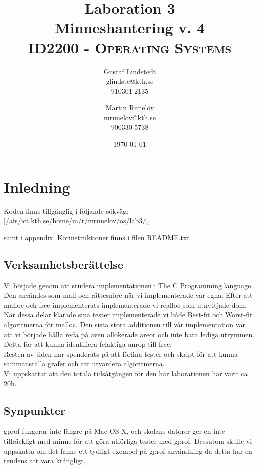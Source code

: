 \documentclass[paper=a4, fontsize=11pt]{scrartcl} %
\title{ 
\huge Laboration 3 \\ Minneshantering v. 4 \\ %
\vspace{10pt}
\normalfont \normalsize 
\textsc{ID2200 - Operating Systems } \\ [25pt] %
}
\author{Gustaf Lindstedt \\ glindste@kth.se \\ 910301-2135 \and Martin Runelöv \\ mrunelov@kth.se \\ 900330-5738}
\date{\vspace{8pt}\normalsize\today} %
\numberwithin{equation}{section} %
\numberwithin{figure}{section} %
\numberwithin{table}{section} %
\begin{document}
\maketitle

\section{Inledning}

Koden finns tillgänglig i följande sökväg: |/afs/ict.kth.se/home/m/r/mrunelov/os/lab3/|,

samt i appendix. Körinstruktioner finns i filen README.txt



\subsection{Verksamhetsberättelse}

Vi började genom att studera implementationen i The C Programming language.
Den användes som mall och rättesnöre när vi implementerade vår egna.
Efter att malloc och free implementerats implementerade vi realloc som
utnyttjade dom.
När dessa delar klarade sina tester implementerade vi både Best-fit och
Worst-fit algoritmerna för malloc.
Den sista stora additionen till vår implementation var att vi började hålla
reda på även allokerade areor och inte bara lediga utrymmen.
Detta för att kunna identifiera felaktiga anrop till free. \\

Resten av tiden har spenderats på att förfina tester och skript för att kunna
sammanställa grafer och att utvärdera algoritmerna.\\

Vi uppskattar att den totala tidsåtgången för den här laborationen har varit
ca 20h.\\


\subsection{Synpunkter}
gprof fungerar inte längre på Mac OS X, och skolans datorer ger en inte
tillräckligt med minne för att göra utförliga tester med gprof.
Dessutom skulle vi uppskatta om det fanns ett tydligt exempel på
gprof-användning då detta har en tendens att vara krångligt.\\
\end{document}
